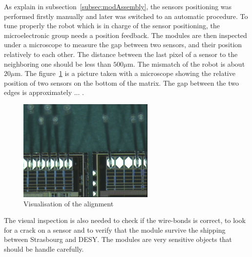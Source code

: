   As explain in subsection~\ref{subsec:modAssembly}, the sensors positioning was performed firstly manually and later was switched to an automatic procedure.
  To tune properly the robot which is in charge of the sensor positioning, the microelectronic group needs a position feedback.
  The modules are then inspected under a microscope to measure the gap between two sensors, and their position relatively to each other.
  The distance between the last pixel of a sensor to the neighboring one should be less than $500 \mu\text{m}$.
  The mismatch of the robot is about $20\mu\text{m}$. 
  The figure~\ref{fig:visAlign} is a picture taken with a microscope showing the relative position of two sensors on the bottom of the matrix.
  The gap between the two edges is approximately ... . 
  
  \begin{figure}
    \centering
    \includegraphics[width=0.6\textwidth]{Pictures/labTests/alignment_sensors.jpg}
    \caption{Visualisation of the alignment}
    \label{fig:visAlign}
  \end{figure}
  
  The visual inspection is also needed to check if the wire-bonds is correct, to look for a crack on a sensor and to verify that the module survive the shipping between Strasbourg and DESY.
  The modules are very sensitive objects that should be handle carefully.


